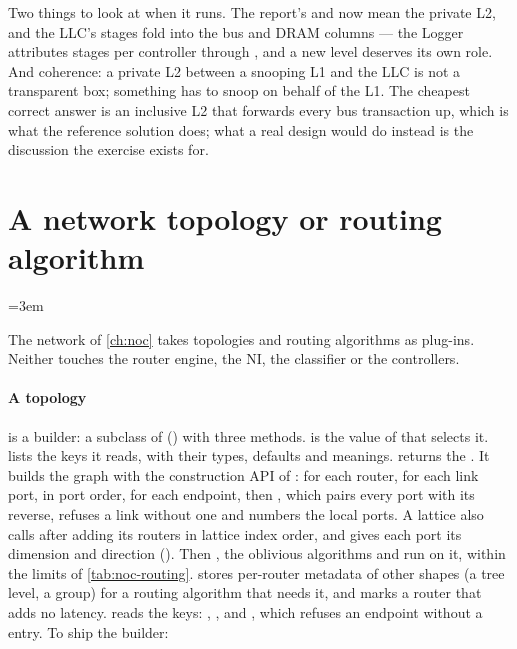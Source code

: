 Two things to look at when it runs. The report's  and  now mean the
private L2, and the LLC's stages fold into the bus and DRAM columns --- the Logger attributes
stages per controller through , and a new level deserves its own role. And
coherence: a private L2 between a snooping L1 and the LLC is not a transparent box; something has
to snoop on behalf of the L1. The cheapest correct answer is an inclusive L2 that forwards every
bus transaction up, which is what the reference solution does; what a real design would do
instead is the discussion the exercise exists for.

\section{A network topology or routing algorithm}\label{sec:extend-noc}
\begingroup\emergencystretch=3em

The network of \cref{ch:noc} takes topologies and routing algorithms as plug-ins. Neither touches
the router engine, the NI, the classifier or the controllers.

\paragraph{A topology} is a builder: a subclass of 
() with three methods.  is the
value of  that selects it.  lists the keys it reads, with their types,
defaults and meanings.  returns the
. It builds the graph with the construction API of :
 for each router,  for each link port, in port
order,  for each endpoint, then , which
pairs every port with its reverse, refuses a link without one and numbers the local ports. A
lattice also calls  after adding its routers in lattice index order, and gives
each port its dimension and direction (). Then ,
the oblivious algorithms and  run on it, within the limits of
\cref{tab:noc-routing}.  stores
per-router metadata of other shapes (a tree level, a group) for a routing algorithm that needs
it, and  marks a router that adds no latency.  reads the keys:
, ,  and , which
refuses an endpoint without a  entry. To ship the builder:

